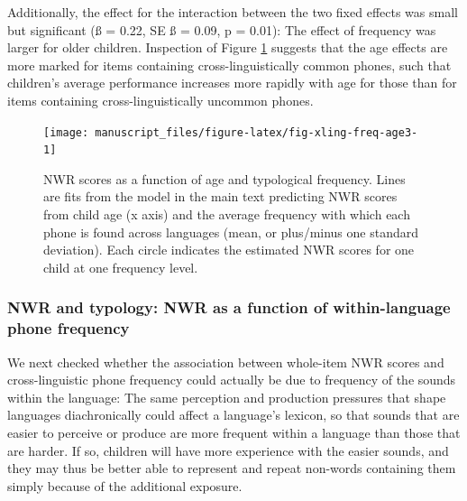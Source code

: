 \documentclass[
  american,
  ,man,floatsintext]{apa6}
\begin{document}
Additionally, the effect for the interaction between the two fixed effects was small but significant (ß = 0.22, SE ß = 0.09, p = 0.01): The effect of frequency was larger for older children. Inspection of Figure \ref{fig:fig-xling-freq-age3} suggests that the age effects are more marked for items containing cross-linguistically common phones, such that children's average performance increases more rapidly with age for those than for items containing cross-linguistically uncommon phones.

\begin{figure}[!t]

{\centering \texttt{[image: manuscript\_files/figure-latex/fig-xling-freq-age3-1]} 

}

\caption{NWR scores as a function of age and typological frequency. Lines are fits from the model in the main text predicting NWR scores from child age (x axis) and the average frequency with which each phone is found across languages (mean, or plus/minus one standard deviation). Each circle indicates the estimated NWR scores for one child at one frequency level.}\label{fig:fig-xling-freq-age3}
\end{figure}

\hypertarget{nwr-and-typology-nwr-as-a-function-of-within-language-phone-frequency}{%
\subsubsection{NWR and typology: NWR as a function of within-language phone frequency}\label{nwr-and-typology-nwr-as-a-function-of-within-language-phone-frequency}}

We next checked whether the association between whole-item NWR scores and cross-linguistic phone frequency could actually be due to frequency of the sounds within the language: The same perception and production pressures that shape languages diachronically could affect a language's lexicon, so that sounds that are easier to perceive or produce are more frequent within a language than those that are harder. If so, children will have more experience with the easier sounds, and they may thus be better able to represent and repeat non-words containing them simply because of the additional exposure.
\end{document}
